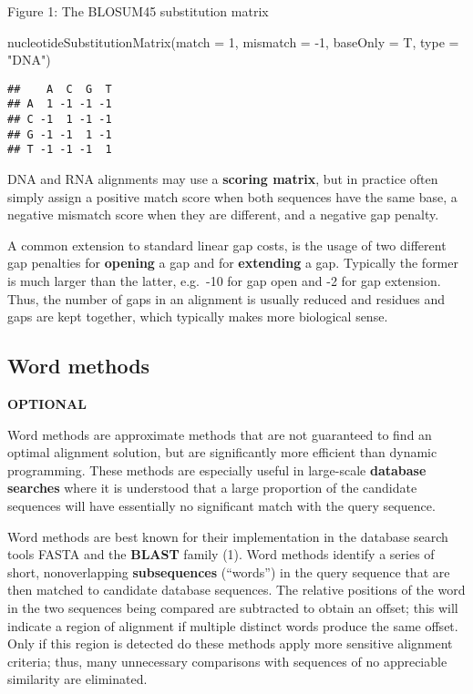 \documentclass[
]{book}
\newenvironment{Shaded}{\begin{snugshade}}{\end{snugshade}}
\newcommand{\AttributeTok}[1]{\textcolor[rgb]{0.77,0.63,0.00}{#1}}
\newcommand{\DecValTok}[1]{\textcolor[rgb]{0.00,0.00,0.81}{#1}}
\newcommand{\FunctionTok}[1]{\textcolor[rgb]{0.00,0.00,0.00}{#1}}
\newcommand{\NormalTok}[1]{#1}
\newcommand{\SpecialCharTok}[1]{\textcolor[rgb]{0.00,0.00,0.00}{#1}}
\newcommand{\StringTok}[1]{\textcolor[rgb]{0.31,0.60,0.02}{#1}}
\begin{document}
Figure 1: The BLOSUM45 substitution matrix

\begin{Shaded}
\begin{Highlighting}[]
\FunctionTok{nucleotideSubstitutionMatrix}\NormalTok{(}\AttributeTok{match =} \DecValTok{1}\NormalTok{, }\AttributeTok{mismatch =} \SpecialCharTok{{-}}\DecValTok{1}\NormalTok{, }\AttributeTok{baseOnly =}\NormalTok{ T, }\AttributeTok{type =} \StringTok{"DNA"}\NormalTok{)}
\end{Highlighting}
\end{Shaded}

\begin{verbatim}
##    A  C  G  T
## A  1 -1 -1 -1
## C -1  1 -1 -1
## G -1 -1  1 -1
## T -1 -1 -1  1
\end{verbatim}

DNA and RNA alignments may use a \textbf{scoring matrix}, but in practice often simply assign a positive match score when both sequences have the same base, a negative mismatch score when they are different, and a negative gap penalty.

A common extension to standard linear gap costs, is the usage of two different gap penalties for \textbf{opening} a gap and for \textbf{extending} a gap. Typically the former is much larger than the latter, e.g.~-10 for gap open and -2 for gap extension. Thus, the number of gaps in an alignment is usually reduced and residues and gaps are kept together, which typically makes more biological sense.

\hypertarget{word-methods}{%
\subsection{Word methods}\label{word-methods}}

\textbf{OPTIONAL}

Word methods are approximate methods that are not guaranteed to find an optimal alignment solution, but are significantly more efficient than dynamic programming. These methods are especially useful in large-scale \textbf{database searches} where it is understood that a large proportion of the candidate sequences will have essentially no significant match with the query sequence.

Word methods are best known for their implementation in the database search tools FASTA and the \textbf{BLAST} family (1). Word methods identify a series of short, nonoverlapping \textbf{subsequences} (``words'') in the query sequence that are then matched to candidate database sequences. The relative positions of the word in the two sequences being compared are subtracted to obtain an offset; this will indicate a region of alignment if multiple distinct words produce the same offset. Only if this region is detected do these methods apply more sensitive alignment criteria; thus, many unnecessary comparisons with sequences of no appreciable similarity are eliminated.
\end{document}
